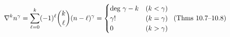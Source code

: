 \documentclass[preview]{standalone}
\begin{document}
\begin{align*}
\special{dvisvgm:raw <g id='unique000'>}\nabla^k n^\gamma = \sum_{\ell=0}^k (-1)^\ell\binom{k}{\ell}(n-\ell)^\gamma = \begin{cases}\text{deg }\gamma-k & (k<\gamma)\\ \gamma! & (k=\gamma)\\ 0 & (k>\gamma)\end{cases}\;\;(\text{Thms 10.7--10.8})\special{dvisvgm:raw </g>}
\end{align*}
\end{document}
